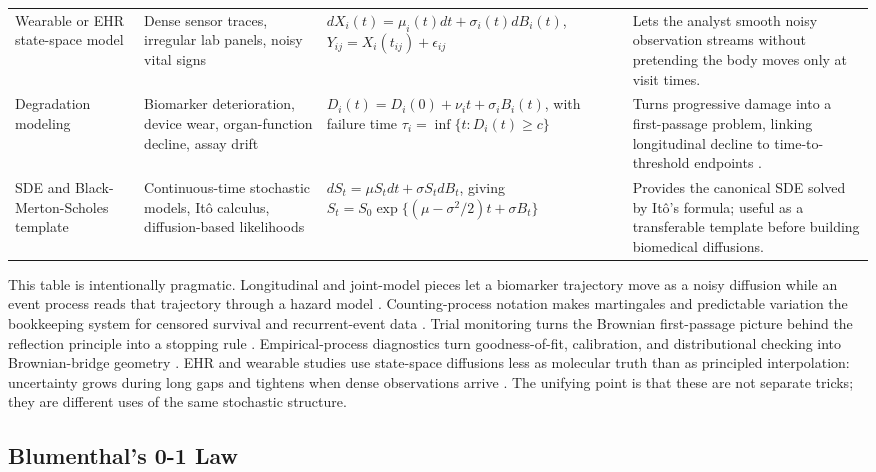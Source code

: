 \documentclass{article}
\theoremstyle{plain}
\theoremstyle{definition}
\begin{document}
\begin{table}[H]
\begin{tabularx}{\textwidth}{>{\RaggedRight\arraybackslash}p{}>{\RaggedRight\arraybackslash}p{}>{\RaggedRight\arraybackslash}p{}>{\RaggedRight\arraybackslash}X}
Wearable or EHR state-space model & Dense sensor traces, irregular lab panels, noisy vital signs &
\(dX_i(t)=\mu_i(t)dt+\sigma_i(t)dB_i(t)\), \(Y_{ij}=X_i(t_{ij})+\epsilon_{ij}\) &
Lets the analyst smooth noisy observation streams without pretending the body moves only at visit times. \\
Degradation modeling & Biomarker deterioration, device wear, organ-function decline, assay drift &
\(D_i(t)=D_i(0)+\nu_i t+\sigma_iB_i(t)\), with failure time \(\tau_i=\inf\{t:D_i(t)\ge c\}\) &
Turns progressive damage into a first-passage problem, linking longitudinal decline to time-to-threshold endpoints \citep{kahle2016degradation}. \\
SDE and Black-Merton-Scholes template & Continuous-time stochastic models, Itô calculus, diffusion-based likelihoods &
\(dS_t=\mu S_tdt+\sigma S_tdB_t\), giving \(S_t=S_0\exp\{(\mu-\sigma^2/2)t+\sigma B_t\}\) &
Provides the canonical SDE solved by Itô's formula; useful as a transferable template before building biomedical diffusions. \\
\bottomrule
\end{tabularx}
\end{table}

This table is intentionally pragmatic. Longitudinal and joint-model pieces let a biomarker trajectory move as a noisy diffusion while an event process reads that trajectory through a hazard model \citep{diggle2002analysis,henderson2000joint,rizopoulos2012joint}. Counting-process notation makes martingales and predictable variation the bookkeeping system for censored survival and recurrent-event data \citep{andersen1982cox,andersen1993statistical,fleming1991counting,aalen2008survival}. Trial monitoring turns the Brownian first-passage picture behind the reflection principle into a stopping rule \citep{lan1983discrete,jennison2000group}. Empirical-process diagnostics turn goodness-of-fit, calibration, and distributional checking into Brownian-bridge geometry \citep{donsker1952justification,billingsley2013convergence,vandervaart1996weak,kosorok2008introduction}. EHR and wearable studies use state-space diffusions less as molecular truth than as principled interpolation: uncertainty grows during long gaps and tightens when dense observations arrive \citep{kalman1960new,durbin2012time}. The unifying point is that these are not separate tricks; they are different uses of the same stochastic structure.

\subsection{Blumenthal's 0-1 Law}
\end{document}
